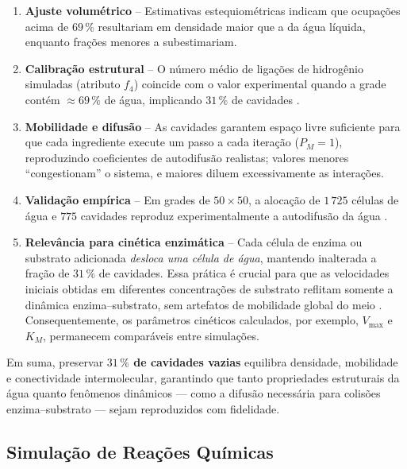 \documentclass[12pt,oneside]{report}
\begin{document}
\begin{enumerate}[label=\alph*]
    \item \textbf{Ajuste volumétrico} – Estimativas estequiométricas indicam que
          ocupações acima de $69\,\%$ resultariam em densidade maior que a da
          água líquida, enquanto frações menores a subestimariam.

    \item \textbf{Calibração estrutural} – O número médio de ligações de
          hidrogênio simuladas (atributo $f_4$) coincide com o valor experimental
          quando a grade contém $\approx69\,\%$ de água, implicando
          $31\,\%$ de cavidades \cite{kier2005}.

    \item \textbf{Mobilidade e difusão} – As cavidades garantem espaço livre
          suficiente para que cada ingrediente execute um passo a cada iteração
          ($P_M=1$), reproduzindo coeficientes de autodifusão realistas; valores
          menores ``congestionam'' o sistema, e maiores diluem excessivamente as
          interações.

    \item \textbf{Validação empírica} – Em grades de $50\times50$, a alocação de
          $1\,725$ células de água e $775$ cavidades reproduz experimentalmente a autodifusão da água \cite{kier2005}.

    \item \textbf{Relevância para cinética enzimática} – Cada célula de
          enzima ou substrato adicionada \emph{desloca uma célula de água},
          mantendo inalterada a fração de $31\,\%$ de cavidades.  Essa prática é
          crucial para que as velocidades iniciais obtidas em diferentes
          concentrações de substrato reflitam somente a dinâmica
          enzima--substrato, sem artefatos de mobilidade global do meio
          \cite{kier2005}.  Consequentemente, os parâmetros cinéticos
          calculados, por exemplo, $V_{\max}$ e $K_M$,
          permanecem comparáveis entre simulações.
\end{enumerate}

Em suma, preservar \textbf{$31\,\%$ de cavidades vazias} equilibra densidade,
mobilidade e conectividade intermolecular, garantindo que tanto propriedades
estruturais da água quanto fenômenos dinâmicos — como a difusão necessária
para colisões enzima--substrato — sejam reproduzidos com fidelidade.

\subsection{Simulação de Reações Químicas}
\end{document}
